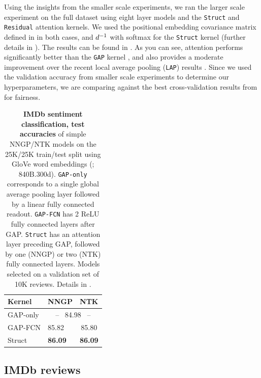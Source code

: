 \documentclass{article}
\begin{document}
Using the insights from the smaller scale experiments, we ran the larger scale experiment on the full dataset using eight layer models and the \texttt{Struct} and \texttt{Residual} attention kernels.
We used the positional embedding covariance matrix defined in  in both cases, and $d^{-1}$ with softmax for the \texttt{Struct} kernel (further details in ).
The results can be found in .
As you can see, attention performs significantly better than the \texttt{GAP} kernel \citep{arora2019}, and also provides a moderate improvement over the recent local average pooling (\texttt{LAP}) results \citep{li2019enhanced}.
Since we used the validation accuracy from smaller scale experiments to determine our hyperparameters, we are comparing against the best cross-validation results from \citep{li2019enhanced} for fairness.


\begin{table}[t]
\caption{\textbf{IMDb sentiment classification, test accuracies} of simple NNGP/NTK models on the  25K/25K train/test split using GloVe word embeddings (\citet{pennington2014glove}; 840B.300d). \texttt{GAP-only} corresponds to a single global average pooling layer followed by a linear fully connected readout. \texttt{GAP-FCN} has 2 ReLU fully connected layers after GAP. \texttt{Struct} has an attention layer preceding GAP, followed by one (NNGP) or two (NTK) fully connected layers. Models selected on a validation set of 10K reviews. Details in .}
\label{tab:imdb_full_results}
\vskip 0.15in
\begin{center}
\begin{small}
\begin{sc}
\begin{tabularx}{\columnwidth}{X l c}
    \toprule
    Kernel & NNGP & NTK \\
    \midrule
    GAP-only &  \multicolumn{2}{c}{--\,\,\,\,\,84.98\,\,\,\,\,--} \\
    GAP-FCN & 85.82 & 85.80 \\
    Struct & \textbf{86.09} & \textbf{86.09} \\
    \bottomrule
\end{tabularx}
\end{sc}
\end{small}
\end{center}
\vskip -0.18in
\end{table}


\subsection{IMDb reviews}\label{sec:imdb}
\end{document}
